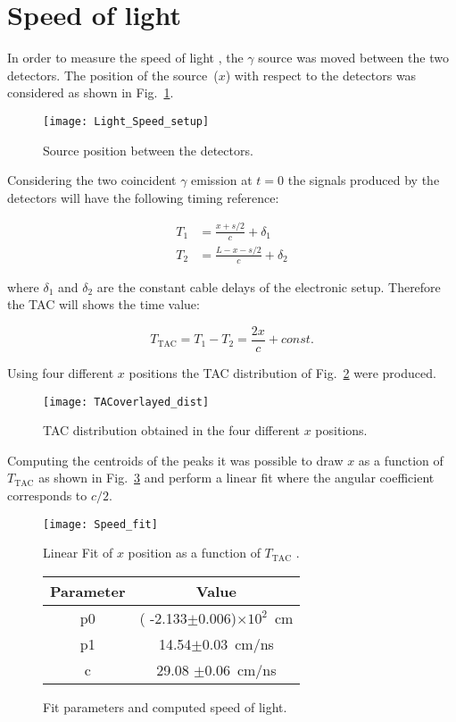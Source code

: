\section*{Speed of light}
In order to measure the speed of light , the $\gamma$ source was moved between the two detectors. The position of the source~($x$) with respect to the detectors was considered as shown in Fig.~\ref{Fig:Src_pos}.
\begin{figure}[h!]
	\centering
	\texttt{[image: Light\_Speed\_setup]}
	\caption{Source position between the detectors.}
	\label{Fig:Src_pos}
\end{figure}

Considering the two coincident $\gamma$ emission at $t=0$ the signals produced by the detectors will have the following timing reference:

\[
\begin{aligned}
T_1 &=\frac{x+s/2}{c}+\delta_1\\
T_2 &=\frac{L-x-s/2}{c}+\delta_2
\end{aligned}
\]

where $\delta_1$ and $\delta_2$ are the constant cable delays of the electronic setup.  Therefore the TAC will shows the time value:

\[
T_{\text{TAC}}=T_1-T_2=\frac{2 x}{c}+const.
\] 

Using four different $x$ positions the  TAC distribution of Fig.~\ref{Fig:TAC_speed_dist} were produced.

\begin{figure}[h]
	\centering
	\texttt{[image: TACoverlayed\_dist]}
	\caption{TAC distribution obtained in the four different $x$ positions.}
	\label{Fig:TAC_speed_dist}
\end{figure}

Computing the centroids of the peaks it was possible to draw $x$ as a function of $T_{\text{TAC}}$ as shown in Fig.~\ref{Fig:Speed_fit} and perform a linear fit where the angular coefficient corresponds to $c/2$.
 
 \begin{figure}[H]
 	\begin{minipage}[b]{0.6\textwidth}
\centering
\texttt{[image: Speed\_fit]}
\caption{Linear Fit of $x$ position as a function of $T_{\text{TAC}}$ .}
\label{Fig:Speed_fit}
 	\end{minipage}
 	\hfill
 	\begin{minipage}[b]{0.45\textwidth}
 		\centering
 		\begin{tabular}{cc}
 			\toprule
 			\toprule
 			Parameter & Value \\
 			\midrule
 			p0     & ( -2.133$\pm$0.006)$\times 10^2$~cm \\
 			p1     & 14.54$\pm$0.03~cm/ns\\
 			c        & 29.08 $\pm$0.06~cm/ns\\
 			\bottomrule
 			\bottomrule
 		\end{tabular}
 		\vspace{1.45cm}
 		\caption*{Fit parameters and computed speed of light.}
 	\end{minipage}
 \end{figure}

